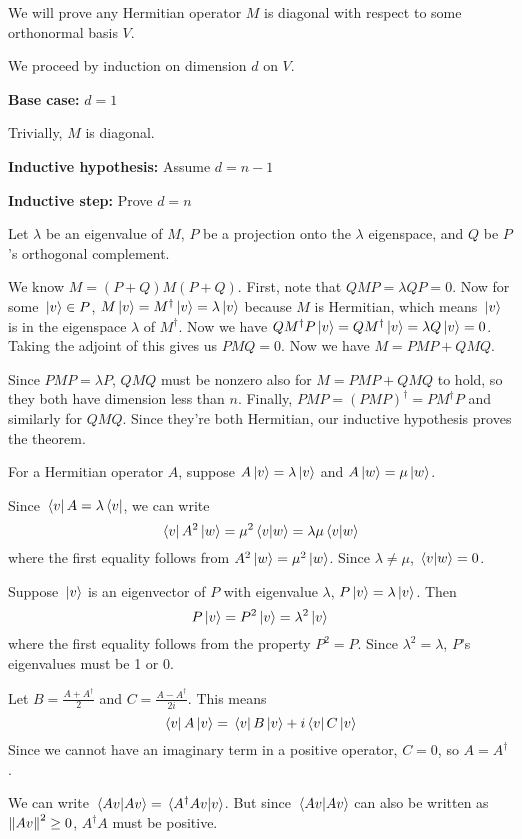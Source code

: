 \exercise
We will prove any Hermitian operator $M$ is diagonal with respect to some orthonormal basis $V$. 

We proceed by induction on dimension $d$ on $V$. 

\textbf{Base case: }$d = 1$

Trivially, $M$ is diagonal. 

\textbf{Inductive hypothesis: } Assume $d = n - 1$

\textbf{Inductive step: } Prove $d = n$

Let $\lambda$ be an eigenvalue of $M$, $P$ be a projection onto the $\lambda$ eigenspace, and $Q$ be $P$'s orthogonal complement. 

We know $M = (P + Q) M (P + Q)$. First, note that $QMP = \lambda QP = 0$. Now for some $\ket*{v} \in P$, $M \ket*{v} = M^{\dagger} \ket*{v} = \lambda \ket*{v}$ because $M$ is Hermitian, which means $\ket*{v}$ is in the eigenspace $\lambda$ of $M^{\dagger}$. Now we have $QM^{\dagger} P \ket*{v} = QM^{\dagger} \ket*{v} = \lambda Q \ket*{v} = 0$. Taking the adjoint of this gives us $PMQ = 0$. Now we have $M = PMP + QMQ$.

Since $PMP = \lambda P$, $QMQ$ must be nonzero also for $M = PMP + QMQ$ to hold, so they both have dimension less than $n$. Finally, $PMP = (PMP)^{\dagger} = PM^{\dagger}P$ and similarly for $QMQ$. Since they're both Hermitian, our inductive hypothesis proves the theorem. 

\exercise
For a Hermitian operator $A$, suppose $A \ket*{v} = \lambda \ket*{v}$ and $A \ket*{w} = \mu \ket*{w}$. 

Since $\bra*{v} A = \lambda \bra*{v}$, we can write 
$$\bra*{v} A^{2} \ket*{w} = \mu^{2} \bra*{v} \ket*{w} = \lambda \mu \bra*{v} \ket*{w}$$
where the first equality follows from $A^{2} \ket*{w} = \mu^{2} \ket*{w}$. Since $\lambda \neq \mu$, $\braket*{v}{w} = 0$. 

\exercise
Suppose $\ket*{v}$ is an eigenvector of $P$ with eigenvalue $\lambda$, $P \ket*{v} = \lambda \ket*{v}$. Then
$$P \ket*{v} = P^{2} \ket*{v} = \lambda^{2} \ket*{v}$$
where the first equality follows from the property $P^{2} = P$. Since $\lambda^{2} = \lambda$, $P$'s eigenvalues must be 1 or 0. 

\exercise
Let $B = \frac{A + A^{\dagger}}{2}$ and $C = \frac{A - A^{\dagger}}{2i}$. This means 
$$\bra*{v} A \ket*{v} = \bra*{v} B \ket*{v} + i \bra*{v} C \ket*{v}$$
Since we cannot have an imaginary term in a positive operator, $C = 0$, so $A = A^{\dagger}$. 

\exercise
We can write $\braket*{Av}{Av} = \braket*{A^{\dagger} A v}{v}$.
But since $\braket*{Av}{Av}$ can also be written as $\norm{Av}^{2} \geq 0$, $A^{\dagger} A$ must be positive. 
 